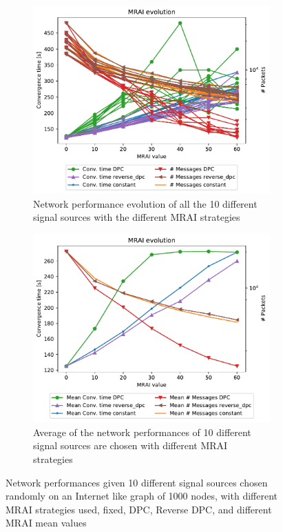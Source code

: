 \begin{figure}[h]
     \centering
     \begin{subfigure}[b]{0.45\textwidth}
         \centering
         \includegraphics[width=\textwidth]{images/position/different_destinations-1000_all.pdf}
		 \caption{Network performance evolution of all the \num{10} different signal sources
			with the different \ac{MRAI} strategies}
         \label{fig:different_destinations_all}
     \end{subfigure}
     \hfill
     \begin{subfigure}[b]{0.45\textwidth}
         \centering
         \includegraphics[width=\textwidth]{images/position/different_destinations-1000_mean.pdf}
		 \caption{Average of the network performances of \num{10} different
			signal sources are chosen with different \ac{MRAI} strategies}
         \label{fig:different_destinations_mean}
     \end{subfigure}
	 \caption{Network performances given \num{10} different signal sources chosen
		randomly on an Internet like graph of \num{1000} nodes, with different
		\ac{MRAI} strategies used, fixed, \ac{DPC}, Reverse \ac{DPC}, and
		different \ac{MRAI} mean values}
	 \label{fig:different_destinations}
\end{figure}

